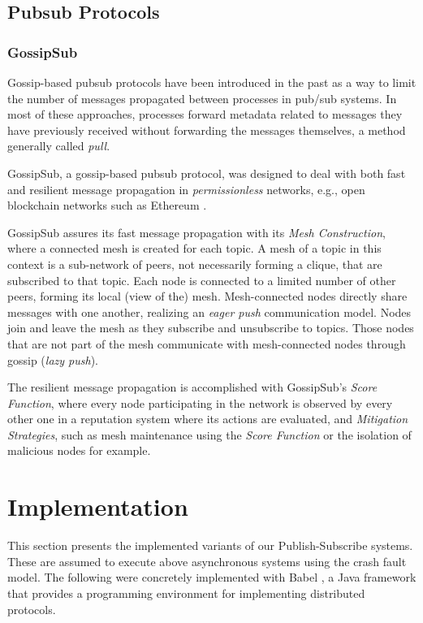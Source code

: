 \documentclass[sigconf]{acmart}
\begin{document}
\subsection{Pubsub Protocols}

\subsubsection{GossipSub} %

Gossip-based pubsub protocols have been introduced in the past as a way to limit the number of messages propagated between processes in pub/sub systems. In most of these approaches, processes forward metadata related to messages they have previously received without forwarding the messages themselves, a method generally called \textit{pull}.

GossipSub, a gossip-based pubsub protocol, was designed to deal with both fast and resilient message propagation in \textit{permissionless} networks, e.g., open blockchain networks such as Ethereum \cite{dannen2017introducing}.

GossipSub assures its fast message propagation with its \textit{Mesh Construction}, where a connected mesh is created for each topic. A mesh of a topic in this context is a sub-network of peers, not necessarily forming a clique, that are subscribed to that topic. Each node is connected to a limited number of other peers, forming its local (view of the) mesh. Mesh-connected nodes directly share messages with one another, realizing an \textit{eager push} communication model. Nodes join and leave the mesh as they subscribe and unsubscribe to topics. Those nodes that are not part of the mesh communicate with mesh-connected nodes through gossip (\textit{lazy push}).

The resilient message propagation is accomplished with GossipSub's \textit{Score Function}, where every node participating in the network is observed by every other one in a reputation system where its actions are evaluated, and \textit{Mitigation Strategies}, such as mesh maintenance using the \textit{Score Function} or the isolation of malicious nodes for example.

\section{Implementation}

This section presents the implemented variants of our Publish-Subscribe systems. These are assumed to execute above asynchronous systems using the crash fault model.
The following were concretely implemented with Babel \cite{fouto2022babel}, a Java framework that provides a programming environment for implementing distributed protocols.
\end{document}
